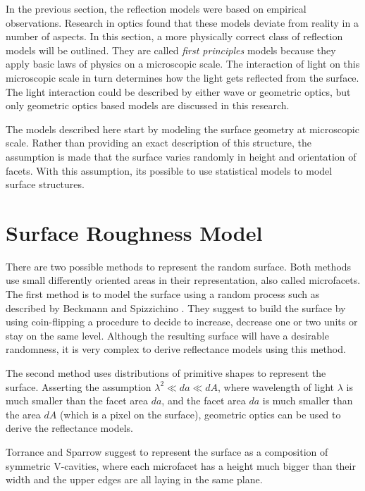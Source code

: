 \hypertarget{Microfacet Models}{
}

\noindent In the previous section, the reflection models were based on empirical observations. Research in optics found that these models deviate from reality in a number of aspects. In this section, a more physically correct class of reflection models will be outlined. They are called {\it first principles} models because they apply basic laws of physics on a microscopic scale. The interaction of light on this microscopic scale in turn determines how the light gets reflected from the surface. The light interaction could be described by either wave or geometric optics, but only geometric optics based models are discussed in this research.

The models described here start by modeling the surface geometry at microscopic scale. Rather than providing an exact description of this structure, the assumption is made that the surface varies randomly in height and orientation of facets. With this assumption, its possible to use statistical models to model surface structures.

\section{Surface Roughness Model}
There are two possible methods to represent the random surface. Both methods use small differently oriented areas in their representation, also called microfacets. The first method is to model the surface using a random process such as described by Beckmann and Spizzichino \cite{BeckmannSpizzichino}. They suggest to build the surface by using coin-flipping a procedure to decide to increase, decrease one or two units or stay on the same level. Although the resulting surface will have a desirable randomness, it is very complex to derive reflectance models using this method. 

The second method uses distributions of primitive shapes to represent the surface. Asserting the assumption $\lambda^2 \ll da \ll dA$, where wavelength of light $\lambda$ is much smaller than the facet area $da$, and the facet area $da$ is much smaller than the area $dA$ (which is a pixel on the surface), geometric optics can be used to derive the reflectance models. 

Torrance and Sparrow suggest to represent the surface as a composition of symmetric V-cavities, where each microfacet has a height much bigger than their width and the upper edges are all laying in the same plane. 


